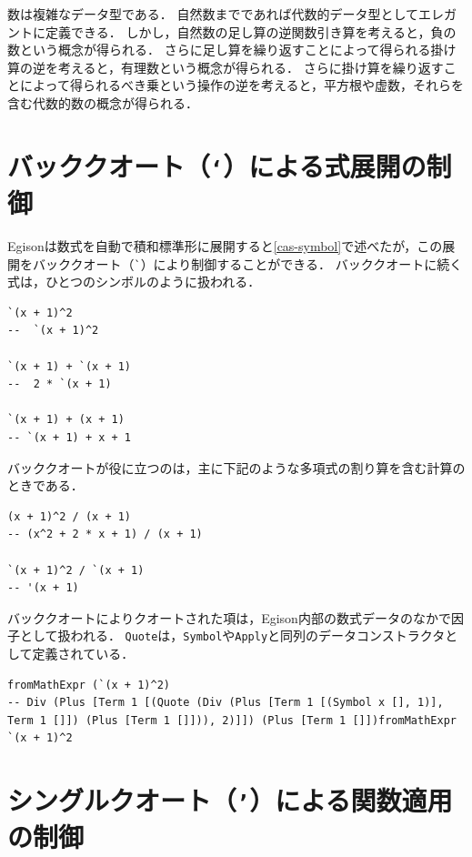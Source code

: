 数は複雑なデータ型である．
自然数までであれば代数的データ型としてエレガントに定義できる．
しかし，自然数の足し算の逆関数引き算を考えると，負の数という概念が得られる．
さらに足し算を繰り返すことによって得られる掛け算の逆を考えると，有理数という概念が得られる．
さらに掛け算を繰り返すことによって得られるべき乗という操作の逆を考えると，平方根や虚数，それらを含む代数的数の概念が得られる．

\section{バッククオート（\texttt{`}）による式展開の制御}\label{mexpr-backquote}

Egisonは数式を自動で積和標準形に展開すると\ref{cas-symbol}で述べたが，この展開をバッククオート（\lstinline{`}）により制御することができる．
バッククオートに続く式は，ひとつのシンボルのように扱われる．
\begin{lstlisting}[language=egison,numbers=none,escapechar=']
`(x + 1)^2
--  `(x + 1)^2

`(x + 1) + `(x + 1)
--  2 * `(x + 1)

`(x + 1) + (x + 1)
-- `(x + 1) + x + 1
\end{lstlisting}

バッククオートが役に立つのは，主に下記のような多項式の割り算を含む計算のときである．
\begin{lstlisting}[language=egison,numbers=none,escapechar=']
(x + 1)^2 / (x + 1)
-- (x^2 + 2 * x + 1) / (x + 1)

`(x + 1)^2 / `(x + 1)
-- '(x + 1)
\end{lstlisting}

バッククオートによりクオートされた項は，Egison内部の数式データのなかで因子として扱われる．
\lstinline{Quote}は，\lstinline{Symbol}や\lstinline{Apply}と同列のデータコンストラクタとして定義されている．
\begin{lstlisting}[language=egison,numbers=none,escapechar=']
fromMathExpr (`(x + 1)^2)
-- Div (Plus [Term 1 [(Quote (Div (Plus [Term 1 [(Symbol x [], 1)], Term 1 []]) (Plus [Term 1 []])), 2)]]) (Plus [Term 1 []])fromMathExpr `(x + 1)^2
\end{lstlisting}

\section{シングルクオート（\texttt{'}）による関数適用の制御}\label{mexpr-squote}


